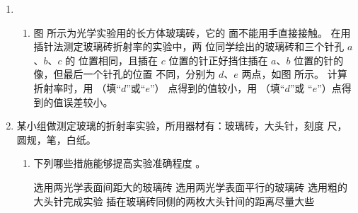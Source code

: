 \begin{enumerate}
\item 
{}
\begin{enumerate}
	\item
图  所示为光学实验用的长方体玻璃砖，它的
 \underlinegap 
面不能用手直接接触。
在用插针法测定玻璃砖折射率的实验中，两
位同学绘出的玻璃砖和三个针孔 $ a $、$ b $、$ c $ 的
位置相同，且插在 $ c $ 位置的针正好挡住插在
$ a $、$ b $ 位置的针的像，但最后一个针孔的位置
不同，分别为 $ d $、$ e $ 两点，如图  所示。
计算折射率时，用
 \underlinegap 
（填“$ d $”或“$ e $”）
 \underlinegap 
点得到的值较小，用
 \underlinegap 
（填“$ d $”或
“$ e $”）点得到的值误差较小。

	
\end{enumerate}
\begin{figure}[h!]
	\centering
\begin{subfigure}{0.4\linewidth}
	\centering
	 
	\caption{}\label{2012重庆22a}
\end{subfigure}
\begin{subfigure}{0.4\linewidth}
	\centering
	 
	\caption{}\label{2012重庆22b}
\end{subfigure}
\end{figure}



\item 
{}
某小组做测定玻璃的折射率实验，所用器材有：玻璃砖，大头针，刻度
尺，圆规，笔，白纸。
\begin{enumerate}
	\item
下列哪些措施能够提高实验准确程度 \underlinegap 。

\fourchoices
{选用两光学表面间距大的玻璃砖}
{选用两光学表面平行的玻璃砖}
{选用粗的大头针完成实验}
{插在玻璃砖同侧的两枚大头针间的距离尽量大些}




\end{enumerate}
\end{enumerate}
